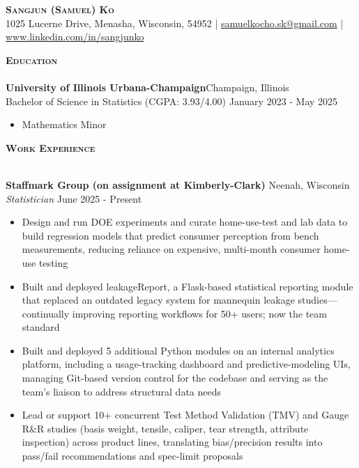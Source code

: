 \documentclass[a4paper]{article}
\newcommand{\lineunder} {
    \vspace*{-8pt} \\
    \hspace*{-18pt} \hrulefill \\
}
\newcommand{\header} [1] {
    {\hspace*{-18pt}\vspace*{6pt} \textsc{#1}}
    \vspace*{-6pt} \lineunder
}
\begin{document}
\vspace*{-40pt}

\vspace*{-10pt}
\begin{center}
    {\Huge \scshape \textbf{Sangjun (Samuel) Ko}}\\
    1025 Lucerne Drive, Menasha, Wisconsin, 54952
    | \href{mailto:samuelkocho.sk@gmail.com}{samuelkocho.sk@gmail.com}
    | \href{https://www.linkedin.com/in/sangjunko}{www.linkedin.com/in/sangjunko}
\end{center}

\header{\textbf{Education}}
\textbf{University of Illinois Urbana-Champaign}\hfill Champaign, Illinois \\
Bachelor of Science in Statistics (CGPA: 3.93/4.00) \hfill January 2023 - May 2025\\
    \begin{itemize}[noitemsep]
        \item Mathematics Minor
    \end{itemize}

\vspace{2mm}

\header{\textbf{Work Experience}}
\vspace{1mm}

\textbf{Staffmark Group (on assignment at Kimberly-Clark)}
\hfill Neenah, Wisconsin\\
\textit{Statistician} \hfill June 2025 - Present\\
\begin{itemize}[noitemsep]
\item Design and run DOE experiments and curate home-use-test and lab data to build
regression models that predict consumer perception from bench measurements, reducing reliance
on expensive, multi-month consumer home-use testing
\item Built and deployed leakageReport, a Flask-based statistical reporting module that
replaced an outdated legacy system for mannequin leakage studies---continually improving
reporting workflows for 50+ users; now the team standard
\item Built and deployed 5 additional Python modules on an internal analytics platform,
including a usage-tracking dashboard and predictive-modeling UIs, managing Git-based version
control for the codebase and serving as the team's liaison to address structural data needs
\item Lead or support 10+ concurrent Test Method Validation (TMV) and Gauge R\&R studies
(basis weight, tensile, caliper, tear strength, attribute inspection) across product lines,
translating bias/precision results into pass/fail recommendations and spec-limit proposals
\end{itemize}
\end{document}
